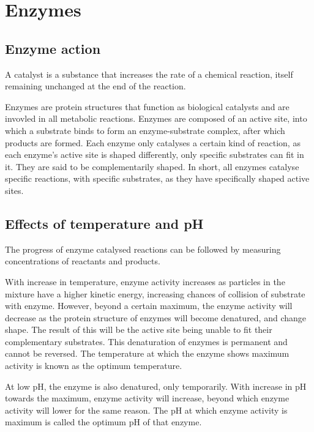 \section{Enzymes}
\subsection{Enzyme action}

A catalyst is a substance that increases the rate of a chemical reaction, itself remaining unchanged
at the end of the reaction.

Enzymes are protein structures that function as biological catalysts and are invovled in all 
metabolic reactions. Enzymes are composed of an active site, into which a substrate binds to 
form an enzyme-substrate complex, after which products are formed. Each enzyme only catalyses a
certain kind of reaction, as each enzyme's active site is shaped differently, only specific
substrates can fit in it. They are said to be complementarily shaped. In short, all enzymes
catalyse specific reactions, with specific substrates, as they have specifically shaped active
sites.

\subsection{Effects of temperature and pH}

The progress of enzyme catalysed reactions can be followed by measuring concentrations of reactants
and products.

With increase in temperature, enzyme activity increases as particles in the mixture have a higher
kinetic energy, increasing chances of collision of substrate with enzyme. However, beyond a certain
maximum, the enzyme activity will decrease as the protein structure of enzymes will become denatured,
and change shape. The result of this will be the active site being unable to fit their complementary
substrates. This denaturation of enzymes is permanent and cannot be reversed. 
The temperature at which the enzyme shows maximum activity is known as the optimum
temperature.

At low pH, the enzyme is also denatured, only temporarily. With increase in pH towards the
maximum, enzyme activity will increase, beyond which enzyme activity will lower for the same reason.
The pH at which enzyme activity is maximum is called the optimum pH of that enzyme.

